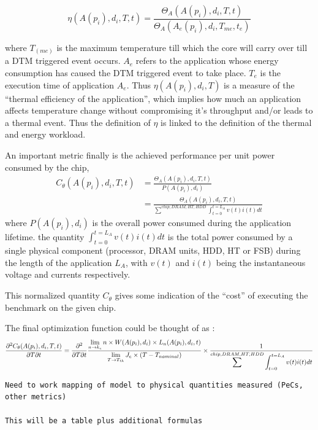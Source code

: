 \documentclass[times,10pt,onecolumn]{article}
\begin{document}
\begin{equation}
\eta(A(p_i), d_i,T, t) = \frac{\Theta_A(A(p_i),d_i, T, t)}{\Theta_A(A_e(p_i),d_i, T_{me}, t_e)} \nonumber
\end{equation}

where $T_(me)$ is the maximum temperature till which the core will carry
over till a DTM triggered event occurs. $A_e$ refers to the application
whose energy consumption has caused the DTM triggered event to take
place. $T_e$ is the execution time of application $A_e$. Thus
$\eta(A(p_i), d_i,T)$ is a measure of the ``thermal efficiency of the
application'', which implies how much an application affects temperature
change without compromising it's throughput and/or leads to a thermal
event. Thus the definition of $\eta$ is linked to the definition of the
thermal and energy workload.

An important metric finally is the achieved performance per unit power
consumed by the chip,
\begin{align}
C_{\theta}(A(p_i), d_i, T, t) &= \frac{\Theta_A(A(p_i),d_i, T, t)}{P(A(p_i),d_i)} \nonumber\\
	             			 &= \frac{\Theta_A(A(p_i),d_i, T, t)}{\displaystyle \sum^{chip,DRAM,HT,HDD} \int_{t=0}^{t=L_A}v(t)i(t)dt} \nonumber
\end{align}
where $P(A(p_i),d_i)$ is the overall power consumed during the
application lifetime. the quantity $\int_{t=0}^{t=L_A}v(t)i(t)dt$ is the
total power consumed by a single physical component (processor, DRAM
units, HDD, HT or FSB) during the length of the application $L_A$, with
$v(t)$ and $i(t)$ being the instantaneous voltage and currents
respectively.

This normalized quantity $C_\theta$ gives some indication of the
``cost'' of executing the benchmark on the given chip.

The final optimization function could be thought of as :
\begin{equation}
\frac{\partial^2 C_{\theta}(A(p_i), d_i, T, t)}{\partial T \partial t} = \frac{\partial^2}{\partial T \partial t} \frac{\displaystyle \lim_{n \to k_e }n \times W(A(p_i),d_i) \times L_n(A(p_i),d_i,t)}{\displaystyle \lim_{T \to T_{th}} J_e \times (T - T_{nominal})} \\
											       \times \frac{1}{\displaystyle \sum^{chip,DRAM,HT,HDD} \int_{t=0}^{t=L_A}v(t)i(t)dt} \nonumber
\end{equation}

\begin{verbatim}
Need to work mapping of model to physical quantities measured (PeCs,
other metrics)

This will be a table plus additional formulas
\end{verbatim}
\end{document}
